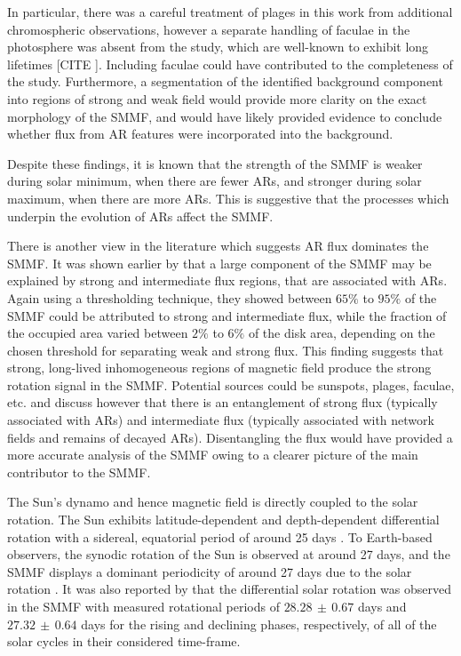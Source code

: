 In particular, there was a careful treatment of plages in this work from additional chromospheric observations, however a separate handling of faculae in the photosphere was absent from the study, which are well-known to exhibit long lifetimes [CITE ]. Including faculae could have contributed to the completeness of the study. Furthermore, a segmentation of the identified background component into regions of strong and weak field would provide more clarity on the exact morphology of the SMMF, and would have likely provided evidence to conclude whether flux from AR features were incorporated into the background.

Despite these findings, it is known that the strength of the SMMF is weaker during solar minimum, when there are fewer ARs, and stronger during solar maximum, when there are more ARs. This is suggestive that the processes which underpin the evolution of ARs affect the SMMF.

There is another view in the literature which suggests AR flux dominates the SMMF. It was shown earlier by \citet{kutsenko_contribution_2017} that a large component of the SMMF may be explained by strong and intermediate flux regions, that are associated with ARs. Again using a thresholding technique, they showed between $65 \%$ to $95 \%$ of the SMMF could be attributed to strong and intermediate flux, while the fraction of the occupied area varied between $2 \%$ to $6 \%$ of the disk area, depending on the chosen threshold for separating weak and strong flux. This finding suggests that strong, long-lived inhomogeneous regions of magnetic field produce the strong rotation signal in the SMMF. Potential sources could be sunspots, plages, faculae, etc. and \citet{kutsenko_contribution_2017} discuss however that there is an entanglement of strong flux (typically associated with ARs) and intermediate flux (typically associated with network fields and remains of decayed ARs). Disentangling the flux would have provided a more accurate analysis of the SMMF owing to a clearer picture of the main contributor to the SMMF.

The Sun's dynamo and hence magnetic field is directly coupled to the solar rotation. The Sun exhibits latitude-dependent and depth-dependent differential rotation with a sidereal, equatorial period of around 25 days \citep{howe_solar_2009}. To Earth-based observers, the synodic rotation of the Sun is observed at around 27 days, and the SMMF displays a dominant periodicity of around 27 days due to the solar rotation \citep{chaplin_studies_2003, xie_temporal_2017, bose_variability_2018}. It was also reported by \citet{xie_temporal_2017} that the differential solar rotation was observed in the SMMF with measured rotational periods of $28.28 \, \pm \, 0.67$ days and $27.32 \, \pm \, 0.64$ days for the rising and declining phases, respectively, of all of the solar cycles in their considered time-frame.

